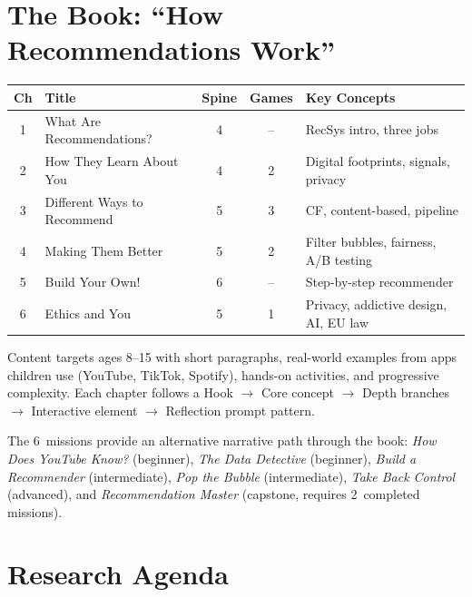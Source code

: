 \documentclass[11pt,a4paper]{article}
\begin{document}
\section{The Book: ``How Recommendations Work''}\label{sec:book}

\begin{center}
\small
\begin{tabular}{@{}clccl@{}}
\toprule
\textbf{Ch} & \textbf{Title} & \textbf{Spine} & \textbf{Games} & \textbf{Key Concepts} \\
\midrule
1 & What Are Recommendations? & 4 & -- & RecSys intro, three jobs \\
2 & How They Learn About You & 4 & 2 & Digital footprints, signals, privacy \\
3 & Different Ways to Recommend & 5 & 3 & CF, content-based, pipeline \\
4 & Making Them Better & 5 & 2 & Filter bubbles, fairness, A/B testing \\
5 & Build Your Own! & 6 & -- & Step-by-step recommender \\
6 & Ethics and You & 5 & 1 & Privacy, addictive design, AI, EU law \\
\bottomrule
\end{tabular}
\end{center}

Content targets ages 8--15 with short paragraphs, real-world examples from apps children use (YouTube, TikTok, Spotify), hands-on activities, and progressive complexity. Each chapter follows a Hook $\to$ Core concept $\to$ Depth branches $\to$ Interactive element $\to$ Reflection prompt pattern.

The 6~missions provide an alternative narrative path through the book: \emph{How Does YouTube Know?} (beginner), \emph{The Data Detective} (beginner), \emph{Build a Recommender} (intermediate), \emph{Pop the Bubble} (intermediate), \emph{Take Back Control} (advanced), and \emph{Recommendation Master} (capstone, requires 2~completed missions).

\section{Research Agenda}\label{sec:research}
\end{document}
